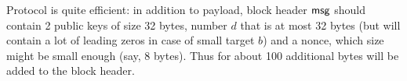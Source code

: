 \documentclass[]{article}
\begin{document}
    Protocol is quite efficient: in addition to payload, block header $\mathsf{msg}$ should
    contain 2 public keys of size 32 bytes, number $d$ that is at most 32 bytes
    (but will contain a lot of leading zeros in case of small target $b$) and a nonce,
    which size might be small enough (say, 8 bytes). Thus for about 100 additional bytes
    will be added to the block header.



    
\end{document}
